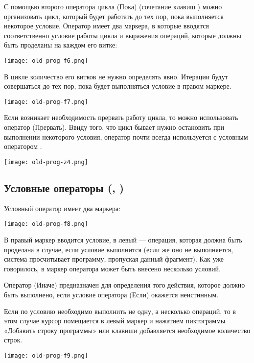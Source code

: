 С помощью второго оператора цикла  (Пока) (сочетание клавиш \keys{\ctrl+]} ) можно организовать цикл, который будет работать до тех пор, пока выполняется некоторое условие. Оператор  имеет два маркера, в которые вводятся соответственно условие работы цикла и выражения операций, которые должны быть проделаны на каждом его витке:
\begin{center}
	\texttt{[image: old-prog-f6.png]}
\end{center}


В цикле  количество его витков не нужно определять явно. Итерации будут совершаться до тех пор, пока будет выполняться условие в правом маркере.

\begin{center}
	\texttt{[image: old-prog-f7.png]}
\end{center}

Если возникает необходимость прервать работу цикла, то можно использовать оператор  (Прервать). Ввиду того, что цикл бывает нужно остановить при выполнении некоторого условия, оператор  почти всегда используется с условным оператором .

\begin{center}
	\texttt{[image: old-prog-z4.png]}
\end{center}


\subsection*{Условные операторы (, )}
Условный оператор  имеет два маркера:
\begin{center}
	\texttt{[image: old-prog-f8.png]}
\end{center}
В правый маркер вводится условие, в левый --- операция, которая должна быть проделана в случае, если условие выполнится (если же оно не выполняется, система просчитывает программу, пропуская данный фрагмент). Как уже говорилось, в маркер оператора может быть внесено несколько условий.

Оператор  (Иначе) предназначен для определения того действия, которое должно быть выполнено, если условие оператора  (Если) окажется неистинным.

Если по условию необходимо выполнить не одну, а несколько операций, то в этом случае курсор помещается в левый маркер и нажатием пиктограммы «Добавить строку программы» или клавиши \keys{]} добавляется необходимое количество строк.
\begin{center}
	\texttt{[image: old-prog-f9.png]}
\end{center}

